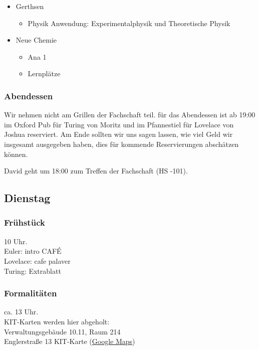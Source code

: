 \documentclass[10pt,ngerman]{scrartcl}
\begin{document}
\begin{multicols}{2}
\begin{itemize}
\begin{itemize}
        \end{itemize}
    \item Gerthsen
        \begin{itemize}
            \item Physik Anwendung: Experimentalphysik und Theoretische Physik
        \end{itemize}
    \item Neue Chemie
        \begin{itemize}
            \item Ana 1
            \item Lernplätze
        \end{itemize}
\end{itemize}

\subsubsection{Abendessen}

Wir nehmen nicht am Grillen der Fachschaft teil. für das Abendessen
ist ab 19:00 im Oxford Pub für Turing von Moritz und im Pfannestiel
für Lovelace von Joshua reserviert. Am Ende sollten wir uns sagen
lassen, wie viel Geld wir insgesamt ausgegeben haben, dies für kommende
Reservierungen abschätzen können.

David geht um 18:00 zum Treffen der Fachschaft (HS -101).



\subsection{Dienstag}

\subsubsection{Frühstück}

10 Uhr. \\
Euler: intro CAFÉ \\
Lovelace: cafe palaver \\
Turing: Extrablatt

\subsubsection{Formalitäten}

ca. 13 Uhr. \\
KIT-Karten werden hier abgeholt: \\
Verwaltungsgebäude 10.11, Raum 214 \\
Englerstraße 13 KIT-Karte
(\href{https://goo.gl/maps/qhAjKJah3wpiFEzq5}{Google Maps})


\end{multicols}
\end{document}
